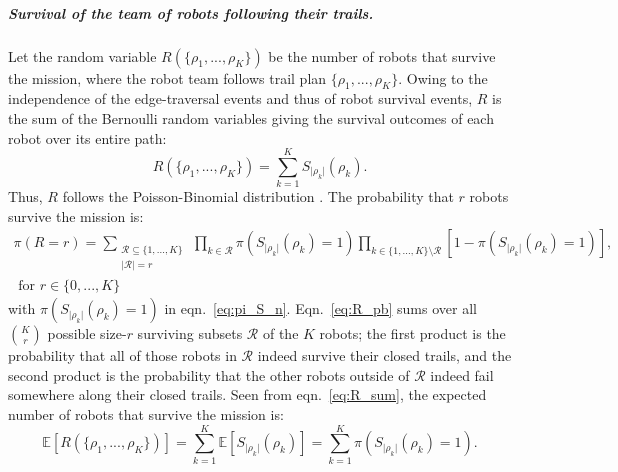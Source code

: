\documentclass[11pt, oneside]{article}
\begin{document}
\subparagraph{Survival of the team of robots following their trails.}
Let the random variable $R(\{\rho_1, ..., \rho_K\})$ be the number of robots that survive the mission, where the robot team follows trail plan $\{\rho_1, ..., \rho_K\}$. Owing to the independence of the edge-traversal events and thus of robot survival events, $R$ is the sum of the Bernoulli random variables giving the survival outcomes of each robot over its entire path:
\begin{equation}
	R(\{\rho_1, ..., \rho_K\})=\sum_{k=1}^K S_{\lvert \rho_k \rvert}(\rho_k). \label{eq:R_sum}
\end{equation}
Thus, $R$ follows the Poisson-Binomial distribution \cite{tang2023poisson}.
The probability that $r$ robots survive the mission is:
\begin{multline}
	\pi(R=r) = \sum_{\substack{\mathcal{R} \subseteq \{1, ..., K\}  \\ \lvert \mathcal{R} \rvert = r} } \,
	\prod_{k \in \mathcal{R}} \pi(S_{\lvert \rho_k \rvert}(\rho_k) = 1)
	\prod_{k \in \{1, ..., K\} \setminus \mathcal{R}} [1- \pi(S_{\lvert \rho_k \rvert}(\rho_k) = 1)], \\ \text{ for } r \in \{0, ..., K\}
	\label{eq:R_pb}
\end{multline} with $ \pi(S_{\lvert \rho_k \rvert}(\rho_k) = 1)$ in eqn.~\ref{eq:pi_S_n}.
Eqn.~\ref{eq:R_pb} sums over all $\binom{K}{r}$ possible size-$r$ surviving subsets $\mathcal{R}$ of the $K$ robots; the first product is the probability that all of those robots in $\mathcal{R}$ indeed survive their closed trails, and the second product is the probability that the other robots outside of $\mathcal{R}$ indeed fail somewhere along their closed trails.
Seen from eqn.~\ref{eq:R_sum}, the expected number of robots that survive the mission is:
\begin{equation}
	\mathbb{E}[R(\{\rho_1, ..., \rho_K\})]=\sum_{k=1}^K \mathbb{E}[S_{\lvert \rho_k \rvert}(\rho_k)] = \sum_{k=1}^K  \pi(S_{\lvert \rho_k \rvert}(\rho_k) = 1).
\end{equation}
\end{document}
